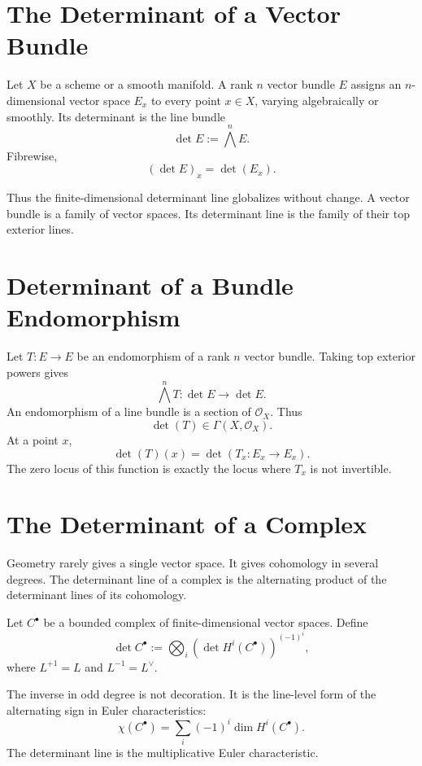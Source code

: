 \documentclass[11pt]{memoir}
\newcommand{\cO}{\mathcal{O}}
\begin{document}
\section{The Determinant of a Vector Bundle}
\label{sec:vector-bundle-det}

Let \(X\) be a scheme or a smooth manifold. A rank \(n\) vector bundle
\(E\) assigns an \(n\)-dimensional vector space \(E_x\) to every point
\(x\in X\), varying algebraically or smoothly. Its determinant is the
line bundle
\[
  \det E:=\bigwedge^n E.
\]
Fibrewise,
\[
  (\det E)_x=\det(E_x).
\]

Thus the finite-dimensional determinant line globalizes without
change. A vector bundle is a family of vector spaces. Its determinant
line is the family of their top exterior lines.

\section{Determinant of a Bundle Endomorphism}
\label{sec:bundle-endomorphism}

Let \(T:E\to E\) be an endomorphism of a rank \(n\) vector bundle.
Taking top exterior powers gives
\[
  \bigwedge^nT:\det E\to\det E.
\]
An endomorphism of a line bundle is a section of \(\cO_X\). Thus
\[
  \det(T)\in \Gamma(X,\cO_X).
\]
At a point \(x\),
\[
  \det(T)(x)=\det(T_x:E_x\to E_x).
\]
The zero locus of this function is exactly the locus where \(T_x\) is
not invertible.

\section{The Determinant of a Complex}
\label{sec:det-complex}

Geometry rarely gives a single vector space. It gives cohomology in
several degrees. The determinant line of a complex is the alternating
product of the determinant lines of its cohomology.

\begin{definition}
\label{def:det-complex}
Let \(C^\bullet\) be a bounded complex of finite-dimensional vector
spaces. Define
\[
  \det C^\bullet
  :=
  \bigotimes_i \left(\det H^i(C^\bullet)\right)^{(-1)^i},
\]
where \(L^{+1}=L\) and \(L^{-1}=L^\vee\).
\end{definition}

The inverse in odd degree is not decoration. It is the line-level
form of the alternating sign in Euler characteristics:
\[
  \chi(C^\bullet)=\sum_i(-1)^i\dim H^i(C^\bullet).
\]
The determinant line is the multiplicative Euler characteristic.
\end{document}
